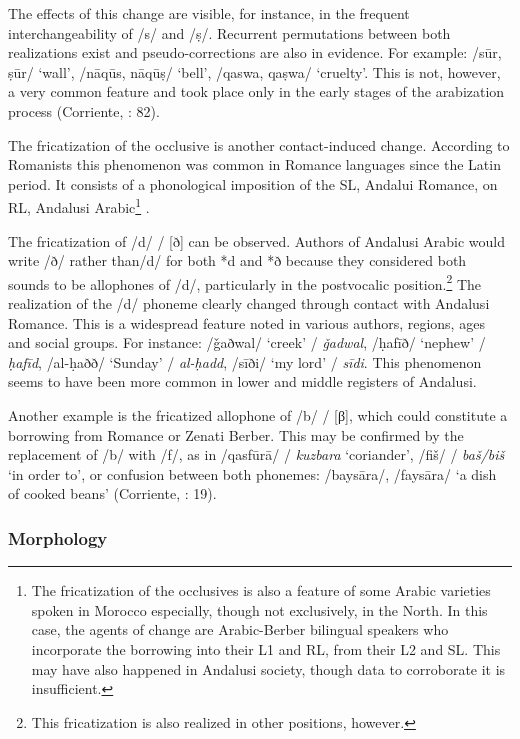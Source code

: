 \documentclass[output=paper,modfonts,nonflat]{langsci/langscibook}
\begin{document}
The effects of this change are visible, for instance, in the frequent interchangeability of /s/ and /ṣ/. Recurrent permutations between both realizations exist and pseudo-corrections are also in evidence. For example: /sūr, ṣūr/ ‘wall’, /nāqūs, nāqūṣ/ ‘bell’, /qaswa, qaṣwa/ ‘cruelty’. This is not, however, a very common feature and took place only in the early stages of the arabization process (Corriente, \citealt{PereiraVicente2015}: 82). 

The fricatization of the occlusive is another contact-induced change. According to Romanists this phenomenon was common in Romance languages since the Latin period. It consists of a phonological imposition of the SL, Andalui Romance, on RL, Andalusi Arabic\footnote{The fricatization of the occlusives is also a feature of some Arabic varieties spoken in Morocco especially, though not exclusively, in the North. In this case, the agents of change are Arabic-Berber bilingual speakers who incorporate the borrowing into their L1 and RL, from their L2 and SL. This may have also happened in Andalusi society, though data to corroborate it is insufficient.} . 

The fricatization of /d/ / [ð] can be observed. Authors of Andalusi Arabic would write {} /ð/ rather than{}/d/ for both *d and *ð because they considered both sounds to be allophones of /d/, particularly in the postvocalic position.\footnote{This fricatization is also realized in other positions, however.}  The realization of the /d/ phoneme clearly changed through contact with Andalusi Romance. This is a widespread feature noted in various authors, regions, ages and social groups. For instance: {} /ǧaðwal/ ‘creek’ / \textit{ǧadwal}, {} /ḥafīð/ ‘nephew’ / \textit{ḥafīd}, { } /al-ḥaðð/ ‘Sunday’ / \textit{al-ḥadd}, {} /sīði/ ‘my lord’ / \textit{sīdi}. This phenomenon seems to have been more common in lower and middle registers of Andalusi. 

Another example is the fricatized allophone of /b/ / [β], which could constitute a borrowing from Romance or Zenati Berber. This may be confirmed by the replacement of /b/ with /f/, as in /qasfūrā/ / \textit{kuzbara} ‘coriander’, /fiš/ / \textit{baš/biš} ‘in order to’, or confusion between both phonemes: /baysāra/, /faysāra/ ‘a dish of cooked beans’ (Corriente, \citealt{PereiraVicente2015}: 19).
 

\subsubsection{Morphology}
\end{document}
